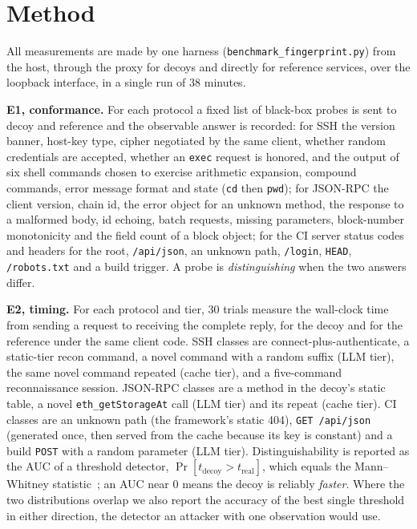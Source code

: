 \documentclass[conference]{IEEEtran}
\begin{document}
\section{Method}
\label{sec:method}
All measurements are made by one harness (\texttt{benchmark\_fingerprint.py}) from the host, through the proxy for decoys and directly for reference services, over the loopback interface, in a single run of 38 minutes.

\textbf{E1, conformance.} For each protocol a fixed list of black-box probes is sent to decoy and reference and the observable answer is recorded: for SSH the version banner, host-key type, cipher negotiated by the same client, whether random credentials are accepted, whether an \texttt{exec} request is honored, and the output of six shell commands chosen to exercise arithmetic expansion, compound commands, error message format and state (\texttt{cd} then \texttt{pwd}); for JSON-RPC the client version, chain id, the error object for an unknown method, the response to a malformed body, id echoing, batch requests, missing parameters, block-number monotonicity and the field count of a block object; for the CI server status codes and headers for the root, \texttt{/api/json}, an unknown path, \texttt{/login}, \texttt{HEAD}, \texttt{/robots.txt} and a build trigger. A probe is \emph{distinguishing} when the two answers differ.

\textbf{E2, timing.} For each protocol and tier, 30 trials measure the wall-clock time from sending a request to receiving the complete reply, for the decoy and for the reference under the same client code. SSH classes are connect-plus-authenticate, a static-tier recon command, a novel command with a random suffix (LLM tier), the same novel command repeated (cache tier), and a five-command reconnaissance session. JSON-RPC classes are a method in the decoy's static table, a novel \texttt{eth\_getStorageAt} call (LLM tier) and its repeat (cache tier). CI classes are an unknown path (the framework's static 404), \texttt{GET /api/json} (generated once, then served from the cache because its key is constant) and a build \texttt{POST} with a random parameter (LLM tier). Distinguishability is reported as the AUC of a threshold detector, $\Pr[t_{\mathrm{decoy}} > t_{\mathrm{real}}]$, which equals the Mann--Whitney statistic~\cite{ref15}; an AUC near 0 means the decoy is reliably \emph{faster}. Where the two distributions overlap we also report the accuracy of the best single threshold in either direction, the detector an attacker with one observation would use.
\end{document}
